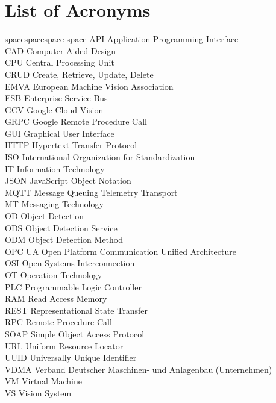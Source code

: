 \chapter*{List of Acronyms}
\thispagestyle{empty}
\begin{tabbing}
spacespacespace \= space \kill
API	 \> 	Application Programming Interface	 \\
CAD	 \> 	Computer Aided Design	 \\
CPU	 \> 	Central Processing Unit	 \\
CRUD	 \> 	Create, Retrieve, Update, Delete	 \\
EMVA \> European Machine Vision Association\\
ESB	\>	Enterprise Service Bus \\
GCV	\>	Google Cloud Vision \\
GRPC     \>  Google Remote Procedure Call\\
GUI	\>	Graphical User Interface \\
HTTP	 \> 	Hypertext Transfer Protocol	 \\
ISO    \>  International Organization for Standardization\\
IT  \>  Information Technology\\
JSON	\>	JavaScript Object Notation \\
MQTT     \>  Message Queuing Telemetry Transport\\
MT      \> Messaging Technology\\
OD     \>  Object Detection\\
ODS     \>  Object Detection Service\\
ODM     \>  Object Detection Method\\
OPC UA     \>  Open Platform Communication Unified Architecture\\
OSI     \>  Open Systems Interconnection\\
OT  \> Operation Technology\\
PLC  \> Programmable Logic Controller\\
RAM    \> Read Access Memory \\
REST    \> Representational State Transfer \\
RPC    \> Remote Procedure Call \\
SOAP	 \> 	Simple Object Access Protocol	 \\
URL	 \> 	Uniform Resource Locator	 \\
UUID	 \> 	Universally Unique Identifier	 \\
VDMA \>     Verband Deutscher Maschinen- und Anlagenbau (Unternehmen) \\
VM	 \> 	Virtual Machine	 \\
VS  \>  Vision System\\
\end{tabbing}
\endinput
